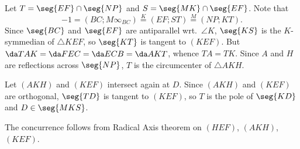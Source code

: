 Let $T=\seg{EF}\cap\seg{NP}$ and $S=\seg{MK}\cap\seg{EF}$. Note that \[-1=(BC;M\infty_{BC})\stackrel K=(EF;ST)\stackrel M=(NP;KT).\]
Since $\seg{BC}$ and $\seg{EF}$ are antiparallel wrt.\ $\angle K$, $\seg{KS}$ is the $K$-symmedian of $\triangle KEF$, so $\seg{KT}$ is tangent to $(KEF)$. But $\da TAK=\da FEC=\da ECB=\da AKT$, whence $TA=TK$. Since $A$ and $H$ are reflections across $\seg{NP}$, $T$ is the circumcenter of $\triangle AKH$.

Let $(AKH)$ and $(KEF)$ intersect again at $D$. Since $(AKH)$ and $(KEF)$ are orthogonal, $\seg{TD}$ is tangent to $(KEF)$, so $T$ is the pole of $\seg{KD}$ and $D\in\seg{MKS}$.

The concurrence follows from Radical Axis theorem on $(HEF)$, $(AKH)$, $(KEF)$.

